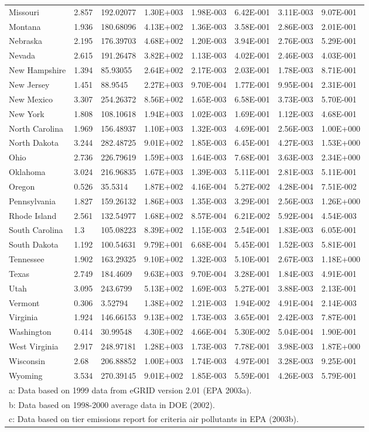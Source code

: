 \begin{longtable}[c]{p{0.75in}p{0.75in}p{0.75in}p{0.75in}p{0.75in}p{0.75in}p{0.75in}p{0.75in}}
Missouri & 2.857 & 192.02077 & 1.30E+003 & 1.98E-003 & 6.42E-001 & 3.11E-003 & 9.07E-001 \tabularnewline
Montana & 1.936 & 180.68096 & 4.13E+002 & 1.36E-003 & 3.58E-001 & 2.86E-003 & 2.01E-001 \tabularnewline
Nebraska & 2.195 & 176.39703 & 4.68E+002 & 1.20E-003 & 3.94E-001 & 2.76E-003 & 5.29E-001 \tabularnewline
Nevada & 2.615 & 191.26478 & 3.82E+002 & 1.13E-003 & 4.02E-001 & 2.46E-003 & 4.03E-001 \tabularnewline
New Hampshire & 1.394 & 85.93055 & 2.64E+002 & 2.17E-003 & 2.03E-001 & 1.78E-003 & 8.71E-001 \tabularnewline
New Jersey & 1.451 & 88.9545 & 2.27E+003 & 9.70E-004 & 1.77E-001 & 9.95E-004 & 2.31E-001 \tabularnewline
New Mexico & 3.307 & 254.26372 & 8.56E+002 & 1.65E-003 & 6.58E-001 & 3.73E-003 & 5.70E-001 \tabularnewline
New York & 1.808 & 108.10618 & 1.94E+003 & 1.02E-003 & 1.69E-001 & 1.12E-003 & 4.68E-001 \tabularnewline
North Carolina & 1.969 & 156.48937 & 1.10E+003 & 1.32E-003 & 4.69E-001 & 2.56E-003 & 1.00E+000 \tabularnewline
North Dakota & 3.244 & 282.48725 & 9.01E+002 & 1.85E-003 & 6.45E-001 & 4.27E-003 & 1.53E+000 \tabularnewline
Ohio & 2.736 & 226.79619 & 1.59E+003 & 1.64E-003 & 7.68E-001 & 3.63E-003 & 2.34E+000 \tabularnewline
Oklahoma & 3.024 & 216.96835 & 1.67E+003 & 1.39E-003 & 5.11E-001 & 2.81E-003 & 5.11E-001 \tabularnewline
Oregon & 0.526 & 35.5314 & 1.87E+002 & 4.16E-004 & 5.27E-002 & 4.28E-004 & 7.51E-002 \tabularnewline
Pennsylvania & 1.827 & 159.26132 & 1.86E+003 & 1.35E-003 & 3.29E-001 & 2.56E-003 & 1.26E+000 \tabularnewline
Rhode Island & 2.561 & 132.54977 & 1.68E+002 & 8.57E-004 & 6.21E-002 & 5.92E-004 & 4.54E-003 \tabularnewline
South Carolina & 1.3 & 105.08223 & 8.39E+002 & 1.15E-003 & 2.54E-001 & 1.83E-003 & 6.05E-001 \tabularnewline
South Dakota & 1.192 & 100.54631 & 9.79E+001 & 6.68E-004 & 5.45E-001 & 1.52E-003 & 5.81E-001 \tabularnewline
Tennessee & 1.902 & 163.29325 & 9.10E+002 & 1.32E-003 & 5.10E-001 & 2.67E-003 & 1.18E+000 \tabularnewline
Texas & 2.749 & 184.4609 & 9.63E+003 & 9.70E-004 & 3.28E-001 & 1.84E-003 & 4.91E-001 \tabularnewline
Utah & 3.095 & 243.6799 & 5.13E+002 & 1.69E-003 & 5.27E-001 & 3.88E-003 & 2.13E-001 \tabularnewline
Vermont & 0.306 & 3.52794 & 1.38E+002 & 1.21E-003 & 1.94E-002 & 4.91E-004 & 2.14E-003 \tabularnewline
Virginia & 1.924 & 146.66153 & 9.13E+002 & 1.73E-003 & 3.65E-001 & 2.42E-003 & 7.87E-001 \tabularnewline
Washington & 0.414 & 30.99548 & 4.30E+002 & 4.66E-004 & 5.30E-002 & 5.04E-004 & 1.90E-001 \tabularnewline
West Virginia & 2.917 & 248.97181 & 1.28E+003 & 1.73E-003 & 7.78E-001 & 3.98E-003 & 1.87E+000 \tabularnewline
Wisconsin & 2.68 & 206.88852 & 1.00E+003 & 1.74E-003 & 4.97E-001 & 3.28E-003 & 9.25E-001 \tabularnewline
Wyoming & 3.534 & 270.39145 & 9.01E+002 & 1.85E-003 & 5.59E-001 & 4.26E-003 & 5.79E-001 \tabularnewline
\midrule
\multicolumn{8}{l}{a: Data based on 1999 data from eGRID version 2.01 (EPA 2003a).} \tabularnewline
\multicolumn{8}{l}{b: Data based on 1998-2000 average data in DOE (2002).} \tabularnewline
\multicolumn{8}{l}{c: Data based on tier emissions report for criteria air pollutants in EPA (2003b).} \tabularnewline
\bottomrule
\end{longtable}

